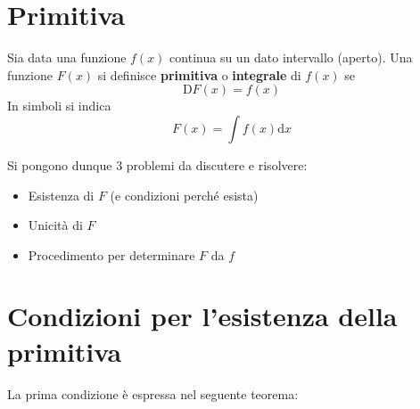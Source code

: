 \documentclass[10pt, oneside]{book}
\theoremstyle{plain}
\begin{document}
\section{Primitiva}
\begin{defin}
    Sia data una funzione $f(x)$ continua su un dato intervallo (aperto). Una funzione $F(x)$ si definisce \textbf{primitiva} o \textbf{integrale} di $f(x)$ se
    \[\textrm{D}F(x) = f(x)\]
    In simboli si indica
    \[F(x) = \int f(x) \textrm{d}x\]
\end{defin}
Si pongono dunque 3 problemi da discutere e risolvere:
\begin{itemize}
    \item Esistenza di $F$ (e condizioni perché esista)
    \item Unicità di $F$
    \item Procedimento per determinare $F$ da $f$
\end{itemize}
\section{Condizioni per l'esistenza della primitiva}
La prima condizione è espressa nel seguente teorema:
\end{document}
